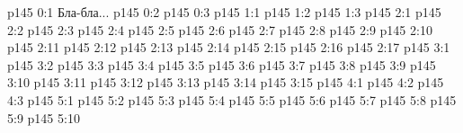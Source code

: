 \author{Промежуточные создания}
\vs p145 0:1  Бла-бла...
\vs p145 0:2 
\vs p145 0:3 
\vs p145 1:1 
\vs p145 1:2 
\vs p145 1:3 
\vs p145 2:1 
\vs p145 2:2 
\vs p145 2:3 
\vs p145 2:4 
\vs p145 2:5 
\vs p145 2:6 
\vs p145 2:7 
\vs p145 2:8 
\vs p145 2:9 
\vs p145 2:10 \pc 
\vs p145 2:11 
\vs p145 2:12 \pc 
\vs p145 2:13 
\vs p145 2:14 
\vs p145 2:15 \pc 
\vs p145 2:16 
\vs p145 2:17 \pc 
{}
\vs p145 3:1 
\vs p145 3:2 
\vs p145 3:3 
\vs p145 3:4 \pc 
\vs p145 3:5 \pc 
\vs p145 3:6 
\vs p145 3:7 
\vs p145 3:8 
\vs p145 3:9 
\vs p145 3:10 
\vs p145 3:11 \pc 
\vs p145 3:12 \pc 
\vs p145 3:13 
\vs p145 3:14 
\vs p145 3:15 
\vs p145 4:1 
\vs p145 4:2 
\vs p145 4:3 
\vs p145 5:1 
\vs p145 5:2 
\vs p145 5:3 
\vs p145 5:4 
\vs p145 5:5 
\vs p145 5:6 
\vs p145 5:7 
\vs p145 5:8 
\vs p145 5:9 
\vs p145 5:10 
\quizlink

